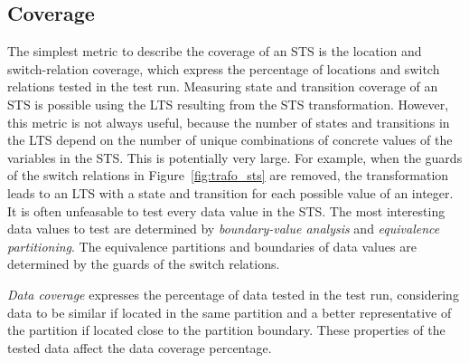 \subsection{Coverage}\label{sec:sts_coverage}
The simplest metric to describe the coverage of an STS is the location and switch-relation coverage, which express the percentage of locations and switch relations tested in the test run. Measuring state and transition coverage of an STS is possible using the LTS resulting from the STS transformation. However, this metric is not always useful, because the number of states and transitions in the LTS depend on the number of unique combinations of concrete values of the variables in the STS. This is potentially very large. For example, when the guards of the switch relations in Figure~\ref{fig:trafo_sts} are removed, the transformation leads to an LTS with a state and transition for each possible value of an integer. It is often unfeasable to test every data value in the STS. The most interesting data values to test are determined by \textit{boundary-value analysis} and \textit{equivalence partitioning}. The equivalence partitions and boundaries of data values are determined by the guards of the switch relations.

\textit{Data coverage} expresses the percentage of data tested in the test run, considering data to be similar if located in the same partition and a better representative of the partition if located close to the partition boundary. These properties of the tested data affect the data coverage percentage.
